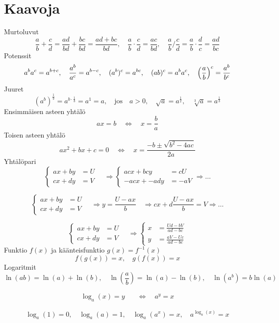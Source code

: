 \documentclass[12pt]{article}
\begin{document}
\section*{Kaavoja}

Murtoluvut
$$
\frac{a}{b}+\frac{c}{d}=\frac{ad}{bd}+\frac{bc}{bd}
=\frac{ad+bc}{bd},\quad 
\frac{a}{b}\cdot\frac{c}{d}=\frac{ac}{bd},\quad
\frac{a}{b}\bigg/\frac{c}{d}=\frac{a}{b}\cdot\frac{d}{c}=\frac{ad}{bc}
$$
Potenssit
$$
a^ba^c=a^{b+c},\quad 
\frac{a^b}{a^c}=a^{b-c},\quad 
(a^b)^c=a^{bc},\quad 
(ab)^c=a^ba^c,\quad 
\left(\frac{a}{b}\right)^c=\frac{a^b}{b^c}
$$
Juuret
$$
(a^b)^{\frac{1}{b}}=a^{b\cdot \frac{1}{b}}=a^1=a,\quad\textrm{jos}\quad a>0,\quad 
\sqrt{a}=a^{\frac{1}{2}},\quad \sqrt[3]{a}=a^{\frac{1}{3}}
$$
Ensimmäisen asteen yhtälö
$$
ax=b\quad\Leftrightarrow\quad x=\frac{b}{a}
$$
Toisen asteen yhtälö
$$
ax^2+bx+c=0\quad\Leftrightarrow\quad x=\frac{-b\pm\sqrt{b^2-4ac}}{2a}
$$
Yhtälöpari
$$
\begin{cases}
ax+by&=U\\
cx+dy&=V
\end{cases}\quad\Rightarrow
\begin{cases}
acx+bcy&=cU\\
-acx+-ady&=-aV
\end{cases}\Rightarrow\ldots
$$

$$
\begin{cases}
ax+by&=U\\
cx+dy&=V
\end{cases}\quad\Rightarrow
y=\frac{U-ax}{b}\quad\Rightarrow
cx+d\frac{U-ax}{b}=V\Rightarrow\ldots
$$

$$
\begin{cases}
ax+by&=U\\
cx+dy&=V
\end{cases}\quad\Rightarrow
\begin{cases}
x&=\frac{Ud-bV}{ad-bc}\\
y&=\frac{aV-Uc}{ad-bc}
\end{cases}
$$
Funktio $f(x)$ ja käänteisfunktio $g(x)=f^{-1}(x)$
$$
f(g(x))=x,\quad
g(f(x))=x
$$
Logaritmit
$$
\ln(ab)=\ln(a)+\ln(b),\quad
\ln(\frac{a}{b})=\ln(a)-\ln(b),\quad
\ln(a^b)=b\ln(a)
$$


\begin{equation*}
\begin{split}
\log_a(x)=y\quad&\Leftrightarrow\quad a^y=x
\end{split}
\end{equation*}


$$
\log_a(1)=0,\quad
\log_a(a)=1,\quad
\log_a(a^x)=x,\quad
a^{\log_a(x)}=x
$$
\end{document}
